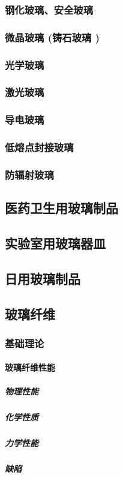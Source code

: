 \documentclass[UTF8]{../../ApplicationUniverse}
\begin{document}
        \subsubsection{钢化玻璃、安全玻璃}
        \subsubsection{微晶玻璃 (铸石玻璃 )}
        \subsubsection{光学玻璃}
        \subsubsection{激光玻璃}
        \subsubsection{导电玻璃}
        \subsubsection{低熔点封接玻璃}
        \subsubsection{防辐射玻璃}
    \subsection{医药卫生用玻璃制品}
    \subsection{实验室用玻璃器皿}
    \subsection{日用玻璃制品}
    \subsection{玻璃纤维}
        \subsubsection{基础理论}
            \paragraph{玻璃纤维性能}
                \subparagraph{物理性能}
                \subparagraph{化学性质}
                \subparagraph{力学性能}
                \subparagraph{缺陷}
\end{document}
